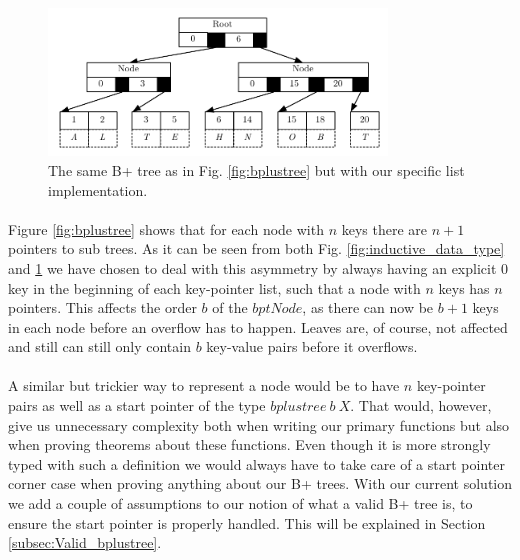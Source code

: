 \begin{figure}
 \centering
   \includegraphics[width=90mm]{diagrams/BPlusTreeImpl.pdf}
 \caption{The same B+ tree as in Fig. \ref{fig:bplustree} but with our specific list implementation.}
 \label{fig:bplustreeImpl}
\end{figure}

\paragraph{}
Figure \ref{fig:bplustree} shows that for each node with $n$ keys there are $n+1$ pointers to sub trees. As it can be seen from both Fig. \ref{fig:inductive_data_type} and \ref{fig:bplustreeImpl} we have chosen to deal with this asymmetry by always having an explicit $0$ key in the beginning of each key-pointer list, such that a node with $n$ keys has $n$ pointers. This affects the order $b$ of the $bptNode$, as there can now be $b+1$ keys in each node before an overflow has to happen. Leaves are, of course, not affected and still can still only contain $b$ key-value pairs before it overflows.
\paragraph{}
A similar but trickier way to represent a node would be to have $n$ key-pointer pairs as well as a start pointer of the type $bplustree~b~X$. That would, however, give us unnecessary complexity both when writing our primary functions but also when proving theorems about these functions. Even though it is more strongly typed with such a definition we would always have to take care of a start pointer corner case when proving anything about our B+ trees. With our current solution we add a couple of assumptions to our notion of what a valid B+ tree is, to ensure the start pointer is properly handled. This will be explained in Section \ref{subsec:Valid_bplustree}.

